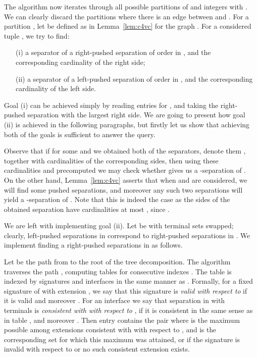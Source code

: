 \documentclass[a4paper,11pt]{article}
\theoremstyle{definition}
\theoremstyle{remark}
\begin{document}
The algorithm now iterates through all possible partitions
 of  and integers  with
.  We can clearly discard the partitions where
there is an edge between  and .  For a partition
, let  be defined as in Lemma~\ref{lem:c4vc}
for the graph .  For a considered tuple ,
we try to find:
\begin{itemize}
\item[(i)] a separator of a right-pushed separation of order  in
  , and the corresponding cardinality of the right side;
\item[(ii)] a separator of a left-pushed separation of order  in
  , and the corresponding cardinality of the left side.
\end{itemize}
Goal (i) can be achieved simply by reading entries
 for , and
taking the right-pushed separation with the largest right side.  We
are going to present how goal (ii) is achieved in the following
paragraphs, but firstly let us show that achieving both of the goals
is sufficient to answer the query.

Observe that if for some  and  we obtained
both of the separators, denote them , together with
cardinalities of the corresponding sides, then using these
cardinalities and precomputed  we may check whether  gives us a -separation of .  On the
other hand, Lemma~\ref{lem:c4vc} asserts that when
 and  are considered, we will find
some pushed separations, and moreover any such two separations will
yield a -separation of .  Note that this is indeed
the case as the sides of the obtained separation have cardinalities at
most , since .

We are left with implementing goal (ii).  Let  be  with
terminal sets swapped; clearly, left-pushed separations in 
correspond to right-pushed separations in .  We implement
finding a right-pushed separations in  as follows.

Let  be the path from  to the root 
of the tree decomposition.  The algorithm traverses the path ,
computing tables  for consecutive indexes .
The table  is indexed by signatures  and interfaces 
in the same manner as .  Formally, for a fixed signature
 of  with extension
, we say that this signature is
{\emph{valid with respect to }} if it is valid and
moreover .  For an interface  we say
that separation  in
 with terminals  is
{\emph{consistent with  with respect to }}, if it
is consistent in the same sense as in table , and moreover
.  Then entry  contains the
pair  where  is the maximum possible 
among extensions consistent with  with respect to
, and  is the corresponding set 
for which this maximum was attained, or  if the signature 
is invalid with respect to  or no such consistent
extension exists.
\end{document}
